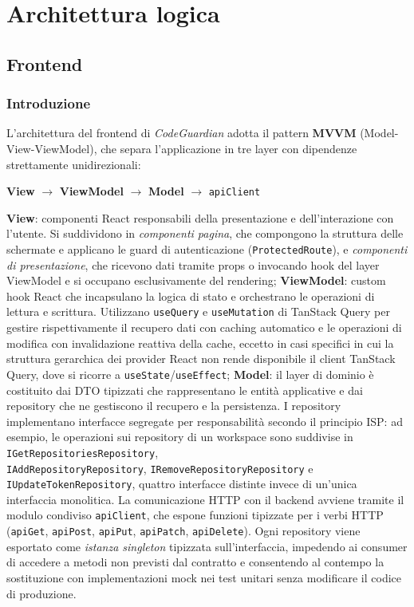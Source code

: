 \documentclass[a4paper, 11pt]{article}
\begin{document}
\section{Architettura logica}
\subsection{Frontend}
\subsubsection{Introduzione}
L'architettura del frontend di \textit{CodeGuardian} adotta il pattern \textbf{MVVM} (Model-View-ViewModel), che separa l'applicazione in tre layer con dipendenze strettamente unidirezionali:

\begin{center}
  \textbf{View} $\longrightarrow$ \textbf{ViewModel} $\longrightarrow$ \textbf{Model} $\longrightarrow$ \texttt{apiClient}
\end{center}
\textbf{View}: componenti React responsabili della presentazione e dell'interazione con l'utente. Si suddividono in \textit{componenti pagina}, che compongono la struttura delle schermate e applicano le guard di autenticazione (\texttt{ProtectedRoute}), e \textit{componenti di presentazione}, che ricevono dati tramite props o invocando hook del layer ViewModel e si occupano esclusivamente del rendering;
\newline
\textbf{ViewModel}: custom hook React che incapsulano la logica di stato e orchestrano le operazioni di lettura e scrittura. Utilizzano \texttt{useQuery} e \texttt{useMutation} di TanStack Query per gestire rispettivamente il recupero dati con caching automatico e le operazioni di modifica con invalidazione reattiva della cache, eccetto in casi specifici in cui la struttura gerarchica dei provider React non rende disponibile il client TanStack Query, dove si ricorre a \texttt{useState}/\texttt{useEffect};
\newline
\textbf{Model}: il layer di dominio è costituito dai DTO tipizzati che rappresentano le entità applicative e dai repository che ne gestiscono il recupero e la persistenza. I repository implementano interfacce segregate per responsabilità secondo il principio ISP: ad esempio, le operazioni sui repository di un workspace sono suddivise in \texttt{IGetRepositoriesRepository}, \\ \texttt{IAddRepositoryRepository}, \texttt{IRemoveRepositoryRepository} e \texttt{IUpdateTokenRepository}, quattro interfacce distinte invece di un'unica interfaccia monolitica. La comunicazione HTTP con il backend avviene tramite il modulo condiviso \texttt{apiClient}, che espone funzioni tipizzate per i verbi HTTP (\texttt{apiGet}, \texttt{apiPost}, \texttt{apiPut}, \texttt{apiPatch}, \texttt{apiDelete}). Ogni repository viene esportato come \textit{istanza singleton} tipizzata sull'interfaccia, impedendo ai consumer di accedere a metodi non previsti dal contratto e consentendo al contempo la sostituzione con implementazioni mock nei test unitari senza modificare il codice di produzione.
\end{document}
